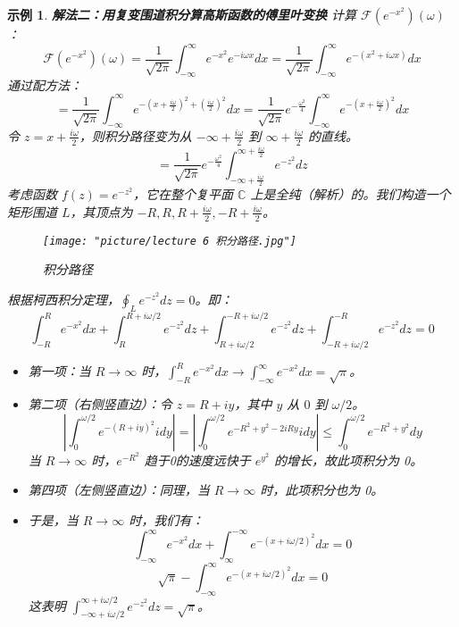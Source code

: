 \documentclass[linespread=1.5,openany]{book}%
\theoremstyle{plain}
\newtheorem{example}[theorem]{示例}
\begin{document}
{{\begin{example}
					\textbf{解法二：用复变围道积分算高斯函数的傅里叶变换}
					计算 \( \mathcal{F}(e^{-x^{2}})(\omega) \)：
					\[
					\mathcal{F}(e^{-x^{2}})(\omega)=\frac{1}{\sqrt{2\pi}}\int_{-\infty}^{\infty}e^{-x^{2}}e^{-i\omega x}dx = \frac{1}{\sqrt{2\pi}}\int_{-\infty}^{\infty}e^{-(x^{2}+i\omega x)}dx\]
					通过配方法：
					\[
					=\frac{1}{\sqrt{2\pi}}\int_{-\infty}^{\infty}e^{-(x + \frac{i\omega}{2})^{2}+(\frac{i\omega}{2})^{2}}dx = \frac{1}{\sqrt{2\pi}}e^{-\frac{\omega^{2}}{4}}\int_{-\infty}^{\infty}e^{-(x + \frac{i\omega}{2})^{2}}dx\]
					令 \( z = x + \frac{i\omega}{2} \)，则积分路径变为从 \(-\infty + \frac{i\omega}{2}\) 到 \(\infty + \frac{i\omega}{2}\) 的直线。
					\[
					= \frac{1}{\sqrt{2\pi}}e^{-\frac{\omega^{2}}{4}}\int_{-\infty + \frac{i\omega}{2}}^{\infty + \frac{i\omega}{2}}e^{-z^{2}}dz
					\]
					考虑函数 \( f(z) = e^{-z^{2}} \)，它在整个复平面 \(\mathbb{C}\) 上是全纯（解析）的。我们构造一个矩形围道 \(L\)，其顶点为 \(-R, R, R+\frac{i\omega}{2}, -R+\frac{i\omega}{2}\)。
					
					\begin{figure}[h]
						\centering
						\texttt{[image: "picture/lecture 6 积分路径.jpg"]}
						\caption{积分路径}
						\label{fig:1}
					\end{figure}
					
					根据柯西积分定理，\(\oint_{L}e^{-z^{2}}dz = 0\)。即：
					\[\int_{-R}^{R}e^{-x^2}dx + \int_{R}^{R+i\omega/2}e^{-z^2}dz + \int_{R+i\omega/2}^{-R+i\omega/2}e^{-z^2}dz + \int_{-R+i\omega/2}^{-R}e^{-z^2}dz = 0 \]
					
					\begin{itemize}
						\item[(i)] 第一项：当 \(R \to \infty\) 时，\(\int_{-R}^{R}e^{-x^{2}}dx \to \int_{-\infty}^{\infty}e^{-x^{2}}dx = \sqrt{\pi}\)。
						
						\item[(ii)] 第二项（右侧竖直边）：令 \( z = R + iy \)，其中 \(y\) 从 \(0\) 到 \(\omega/2\)。
						\[
						\left|\int_{0}^{\omega/2}e^{-(R+iy)^{2}}i dy\right| = \left|\int_{0}^{\omega/2}e^{-R^2+y^2-2iRy}i dy\right| \leq \int_{0}^{\omega/2}e^{-R^2+y^2}dy 
						\]
						当 \(R \to \infty\) 时，\(e^{-R^2}\) 趋于0的速度远快于 \(e^{y^2}\) 的增长，故此项积分为 0。
						
						\item[(iii)] 第四项（左侧竖直边）：同理，当 \(R \to \infty\) 时，此项积分也为 0。
						
						\item[(iv)] 于是，当 \(R \to \infty\) 时，我们有：
						\[ \int_{-\infty}^{\infty}e^{-x^2}dx + \int_{\infty}^{-\infty}e^{-(x+i\omega/2)^2}dx = 0 \]
						\[ \sqrt{\pi} - \int_{-\infty}^{\infty}e^{-(x+i\omega/2)^2}dx = 0 \]
						这表明 \(\int_{-\infty + i\omega/2}^{\infty + i\omega/2}e^{-z^{2}}dz = \sqrt{\pi}\)。
						

\end{itemize}
\end{example}}}
\end{document}
